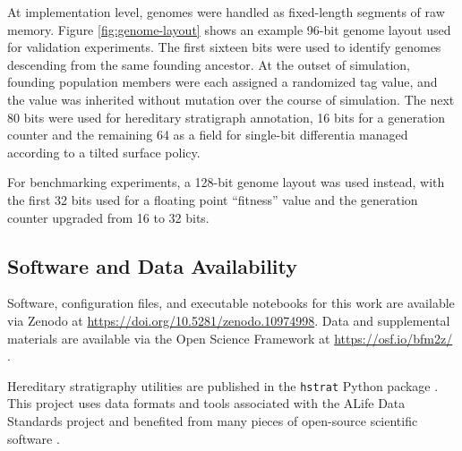
At implementation level, genomes were handled as fixed-length segments of raw memory.
Figure \ref{fig:genome-layout} shows an example 96-bit genome layout used for validation experiments.
The first sixteen bits were used to identify genomes descending from the same founding ancestor.
At the outset of simulation, founding population members were each assigned a randomized tag value, and the value was inherited without mutation over the course of simulation.
The next 80 bits were used for hereditary stratigraph annotation, 16 bits for a generation counter and the remaining 64 as a field for single-bit differentia managed according to a tilted surface policy.

For benchmarking experiments, a 128-bit genome layout was used instead, with the first 32 bits used for a floating point ``fitness'' value and the generation counter upgraded from 16 to 32 bits.

\subsection{Software and Data Availability}

Software, configuration files, and executable notebooks for this work are available via Zenodo at \url{https://doi.org/10.5281/zenodo.10974998}.
Data and supplemental materials are available via the Open Science Framework at \url{https://osf.io/bfm2z/} \citep{foster2017open}.

Hereditary stratigraphy utilities are published in the \texttt{hstrat} Python package \citep{moreno2022hstrat}.
This project uses data formats and tools associated with the ALife Data Standards project \citep{lalejini2019data} and benefited from many pieces of open-source scientific software \citep{huerta2016ete,2020SciPy-NMeth,harris2020array,reback2020pandas,mckinney-proc-scipy-2010,cock2009biopython,waskom2021seaborn,hunter2007matplotlib,moreno2024apc,moreno2024pecking,moreno2024hsurf,moreno2024wse,dolson2024phylotrackpy}.


